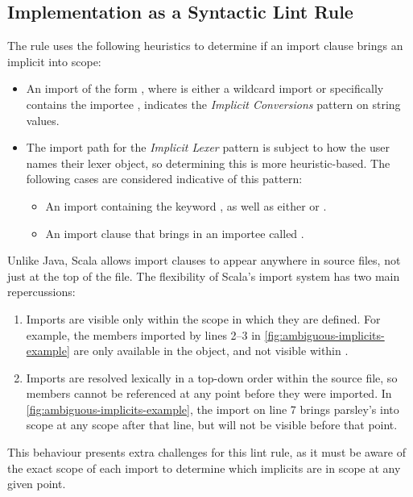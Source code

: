 \documentclass[../../main.tex]{subfiles}
\begin{document}
\subsection{Implementation as a Syntactic Lint Rule}
The rule uses the following heuristics to determine if an import clause brings an implicit into scope:
\begin{itemize}
  \item An import of the form , where  is either a wildcard import or specifically contains the importee , indicates the \emph{Implicit Conversions} pattern on string values.
  \item The import path for the \emph{Implicit Lexer} pattern is subject to how the user names their lexer object, so determining this is more heuristic-based. The following cases are considered indicative of this pattern:
  \begin{itemize}
    \item An import containing the keyword , as well as either  or .
    \item An import clause that brings in an importee called .
  \end{itemize}
\end{itemize}
%
Unlike Java, Scala allows import clauses to appear anywhere in source files, not just at the top of the file.
The flexibility of Scala's import system has two main repercussions:
\begin{enumerate}
  \item Imports are visible only within the scope in which they are defined. For example, the members imported by lines 2--3 in \cref{fig:ambiguous-implicits-example} are only available in the  object, and not visible within .
  \item Imports are resolved lexically in a top-down order within the source file, so members cannot be referenced at any point before they were imported. In \cref{fig:ambiguous-implicits-example}, the import on line 7 brings parsley's  into scope at any scope after that line, but will not be visible before that point.
\end{enumerate} 
This behaviour presents extra challenges for this lint rule, as it must be aware of the exact scope of each import to determine which implicits are in scope at any given point.
\end{document}
